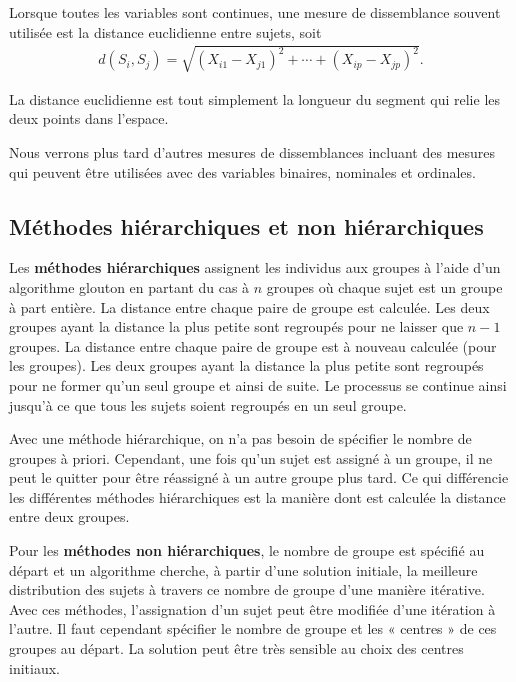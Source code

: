 \documentclass[
  11pt,
  letterpaper,
]{book}
\theoremstyle{definition}
\theoremstyle{definition}
\theoremstyle{definition}
\theoremstyle{definition}
\theoremstyle{remark}
\begin{document}
Lorsque toutes les variables sont continues, une mesure de dissemblance souvent utilisée est la distance euclidienne entre sujets, soit
\begin{align*}
d(S_i, S_j) = \sqrt{(X_{i1}-X_{j1})^2 + \cdots + (X_{ip}-X_{jp})^2}.
\end{align*}

La distance euclidienne est tout simplement la longueur du segment qui relie les deux points dans l'espace.

Nous verrons plus tard d'autres mesures de dissemblances incluant des mesures qui peuvent être utilisées avec des variables binaires, nominales et ordinales.

\hypertarget{muxe9thodes-hiuxe9rarchiques-et-non-hiuxe9rarchiques}{%
\subsection{Méthodes hiérarchiques et non hiérarchiques}\label{muxe9thodes-hiuxe9rarchiques-et-non-hiuxe9rarchiques}}

Les \textbf{méthodes hiérarchiques} assignent les individus aux groupes à l'aide d'un algorithme glouton en partant du cas à \(n\) groupes où chaque sujet est un groupe à part entière. La distance entre chaque paire de groupe est calculée. Les deux groupes ayant la distance la plus petite sont regroupés pour ne laisser que \(n-1\) groupes. La distance entre chaque paire de groupe est à nouveau calculée (pour les groupes). Les deux groupes ayant la distance la plus petite sont regroupés pour ne former qu'un seul groupe et ainsi de suite. Le processus se continue ainsi jusqu'à ce que tous les sujets soient regroupés en un seul groupe.

Avec une méthode hiérarchique, on n'a pas besoin de spécifier le nombre de groupes à priori. Cependant, une fois qu'un sujet est assigné à un groupe, il ne peut le quitter pour être réassigné à un autre groupe plus tard. Ce qui différencie les différentes méthodes hiérarchiques est la manière dont est calculée la distance entre deux groupes.

Pour les \textbf{méthodes non hiérarchiques}, le nombre de groupe est spécifié au départ et un algorithme cherche, à partir d'une solution initiale, la meilleure distribution des sujets à travers ce nombre de groupe d'une manière itérative. Avec ces méthodes, l'assignation d'un sujet peut être modifiée d'une itération à l'autre. Il faut cependant spécifier le nombre de groupe et les « centres » de ces groupes au départ. La solution peut être très sensible au choix des centres initiaux.
\end{document}
